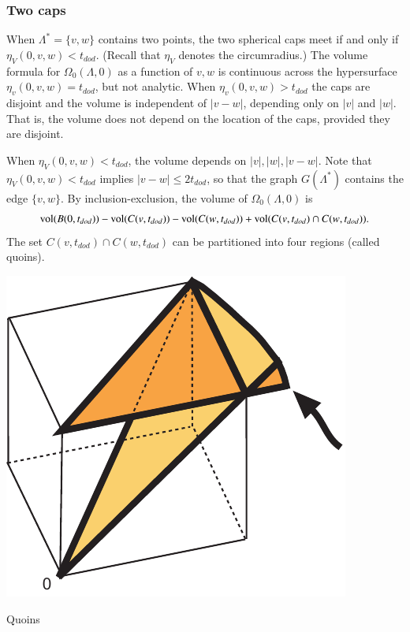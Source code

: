 \documentclass{article} %
\begin{document}
\subsubsection{Two caps}

When $\Lambda^*=\{v,w\}$ contains two points, the two spherical
caps meet if and only if $\eta_V(0,v,w) < t_{dod}$.  (Recall that
$\eta_V$ denotes the circumradius.)   The volume formula for
$\Omega_0(\Lambda,0)$ as a function of $v,w$ is continuous
across the hypersurface $\eta_v(0,v,w)=t_{dod}$, but not analytic.
When $\eta_v(0,v,w) > t_{dod}$ the caps are disjoint and the
volume is independent of $|v-w|$, depending only on $|v|$ and $|w|$.
That is, the volume does not depend on the location of the caps,
provided they are disjoint.

When $\eta_V(0,v,w) < t_{dod}$, the volume depends on
$|v|,|w|,|v-w|$.  Note that $\eta_V(0,v,w) < t_{dod}$ implies
$|v-w|\le 2t_{dod}$, so that the graph $G(\Lambda^*)$ contains
the edge $\{v,w\}$.
By inclusion-exclusion, the volume of $\Omega_0(\Lambda,0)$ is
\begin{equation}\label{eqn:in-ex}
  {\operatorname{vol}}(B(0,t_{dod})) - {\operatorname{vol}}(C(v,t_{dod})) - {\operatorname{vol}}(C(w,t_{dod})) +
  {\operatorname{vol}}(C(v,t_{dod}) \cap C(w,t_{dod})).
\end{equation}
The set $C(v,t_{dod})\cap C(w,t_{dod})$ can be partitioned into four
regions (called quoins). 

\begin{Figure}
  \begin{center}
    \includegraphics[scale=0.50]{images/quoin.pdf}
  \end{center}
  \caption{Quoins}
  \label{fig:quoin}
 \end{Figure}
\end{document}
